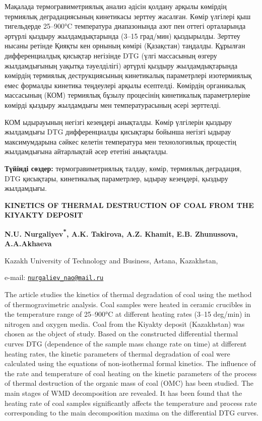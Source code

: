 Мақалада термогравиметриялық анализ әдісін қолдану арқылы көмірдің
термиялық деградациясының кинетикасы зерттеу жасалған. Көмір үлгілері
қыш тигельдерде 25--900°C температура диапазонында азот пен оттегі
орталарында әртүрлі қыздыру жылдамдықтарында (3--15 град/мин)
қыздырылды. Зерттеу нысаны ретінде Қияқты кен орнының көмірі (Қазақстан)
таңдалды. Құрылған дифференциалдық қисықтар негізінде DTG (үлгі
массасының өзгеру жылдамдығының уақытқа тәуелділігі) әртүрлі қыздыру
жылдамдықтарында көмірдің термиялық деструкциясының кинетикалық
параметрлері изотермиялық емес формалды кинетика теңдеулері арқылы
есептелді. Көмірдің органикалық массасының (КОМ) термиялық бұзылу
процесінің кинетикалық параметрлеріне көмірді қыздыру жылдамдығы мен
температурасының әсері зерттелді.

КОМ ыдырауының негізгі кезеңдері анықталды. Көмір үлгілерін қыздыру
жылдамдығы DTG дифференциалды қисықтары бойынша негізгі ыдырау
максимумдарына сәйкес келетін температура мен технологиялық процестің
жылдамдығына айтарлықтай әсер ететіні анықталды.

\begin{center}
{\large\bfseries Түйінді сөздер:} термогравиметриялық талдау, көмір, термиялық
деградация, DTG қисықтары, кинетикалық параметрлер, ыдырау кезеңдері,
қыздыру жылдамдығы.

{\bfseries KINETICS OF THERMAL DESTRUCTION OF COAL FROM THE KIYAKTY
DEPOSIT}

{\bfseries N.U. Nurgaliyev\textsuperscript{*}, A.K. Takirova, A.Z. Khamit,
E.B. Zhunussova, A.A.Akhaeva}

Kazakh University of Technology and Business, Astana, Kazakhstan,

e-mail:
\href{mailto:nurgaliev_nao@mail.ru}{\nolinkurl{nurgaliev\_nao@mail.ru}}
\end{center}

The article studies the kinetics of thermal degradation of coal using
the method of thermogravimetric analysis. Coal samples were heated in
ceramic crucibles in the temperature range of 25--900°C at different
heating rates (3--15 deg/min) in nitrogen and oxygen media. Coal from
the Kiyakty deposit (Kazakhstan) was chosen as the object of study.
Based on the constructed differential thermal curves DTG (dependence of
the sample mass change rate on time) at different heating rates, the
kinetic parameters of thermal degradation of coal were calculated using
the equations of non-isothermal formal kinetics. The influence of the
rate and temperature of coal heating on the kinetic parameters of the
process of thermal destruction of the organic mass of coal (OMC) has
been studied. The main stages of WMD decomposition are revealed. It has
been found that the heating rate of coal samples significantly affects
the temperature and process rate corresponding to the main decomposition
maxima on the differential DTG curves.

